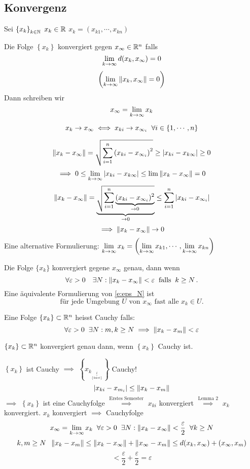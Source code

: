 \subsection{Konvergenz}
Sei $\left\{ x_k \right\}_{k\in\mathbb{N}}$ $x_k\in\mathbb{R}$ $x_k=\left( x_{k1}, \cdots, x_{kn} \right)$
\begin{Def}
  Die Folge $\left\{ x_k \right\}$ konvergiert gegen $x_\infty\in\mathbb{R}^n$ falls
  \[\displaystyle\lim_{k\rightarrow\infty}d(x_k,x_\infty)=0\]
  \[\left( \displaystyle\lim_{k\rightarrow\infty}\left\| x_k,x_\infty \right\|=0 \right)\]
  Dann schreiben wir
  \[x_\infty=\displaystyle\lim_{k\rightarrow\infty}x_k\]
\end{Def}
\begin{Sat}
  \[x_k\rightarrow x_\infty\iff x_{ki}\rightarrow x_{\infty_i}\hspace{2mm}\forall i\in\left\{ 1,\cdots,n \right\}\]
\end{Sat}
\begin{Bew}
  \[\left\| x_k - x_\infty \right\|=\sqrt{\sum_{i=1}^n\left( x_{ki}-x_{\infty_i} \right)^2}\geq \left| x_{ki}-x_{k\infty} \right|\geq 0\]
  \[\implies 0\leq \displaystyle\lim_{k\rightarrow\infty}\left| x_{ki}-x_{k\infty} \right|\leq \lim\left\| x_k-x_\infty \right\|=0\]
  \[\left\| x_k-x_\infty \right\|=\underbrace{\sqrt{\sum_{i=1}^n\underbrace{(x_{ki}-x_{\infty_i})^2}_{\rightarrow 0}}}_{\rightarrow 0}\leq \sum_{i=1}^n\left| x_{ki}-x_{\infty_i} \right|\]
  \[\implies \left\| x_k-x_\infty \right\|\rightarrow 0\]
  Eine alternative Formulierung: $\displaystyle\lim_{k\rightarrow\infty}x_k=\left( \displaystyle\lim_{k\rightarrow\infty} x_{k1},\cdots,\displaystyle\lim_{k\rightarrow\infty} x_{kn} \right)$
\end{Bew}
\begin{Bem} Die Folge $\{x_k\}$ konvergiert gegene $x_\infty$ genau, dann wenn
\begin{equation}\label{e:eps_N}
\forall \varepsilon>0\quad \exists N: \left\| x_k-x_\infty \right\|<\varepsilon\hspace{2mm}\text{falls}\hspace{2mm} k\geq N\, .
\end{equation}
Eine \"aquivalente Formulierung von \eqref{e:eps_N} ist
\begin{equation}\label{e:Konv_Umg}
\mbox{f\"ur jede Umgebung $U$ von $x_\infty$ fast alle $x_k\in U$}.
\end{equation}
\end{Bem}
\begin{Def}
  Eine Folge $\left\{ x_k \right\}\subset\mathbb{R}^n$ heisst Cauchy falls:
  \[\forall \varepsilon>0\hspace{2mm}\exists N: m,k\geq N\implies \left\| x_k-x_m \right\|<\varepsilon\]
\end{Def}
\begin{Lem}
  $\left\{ x_k \right\}\subset\mathbb{R}^n$ konvergiert genau dann, wenn $\left\{ x_k \right\}$ Cauchy ist.
\end{Lem}
\begin{Bew}
  $\left\{ x_k \right\}$ ist Cauchy $\implies$ $\left\{ x_{k_{\underbrace{i}_{\left\{ \text{fixiert} \right\}}}} \right\}$ Cauchy!
  \[\left| x_{ki}-x_{m_i} \right|\leq\left\| x_k-x_m \right\|\]
  $\implies$ $\left\{ x_k \right\}$ ist eine Cauchyfolge $\stackrel{\text{Erstes Semester}}{\implies}$ $x_{ki}$ konvergiert $\stackrel{\text{Lemma 2}}{\implies}$ $x_k$ konvergiert. $x_k$ konvergiert $\implies$ Cauchyfolge
  \[x_\infty=\displaystyle\lim_{k\rightarrow\infty} x_k\hspace{2mm}\forall \varepsilon>0\hspace{2mm}\exists N:\left\| x_k-x_\infty \right\|<\frac{\varepsilon}{2}\hspace{2mm}\forall k\geq N\]
  \[k,m\geq N\hspace{2mm} \left\| x_k-x_m \right\|\leq \left\| x_k-x_\infty \right\|+\left\| x_\infty-x_m \right\|\leq d(x_k,x_\infty)+(x_\infty,x_m)\]
  \[<\frac{\varepsilon}{2}+\frac{\varepsilon}{2}=\varepsilon\]
\end{Bew}
